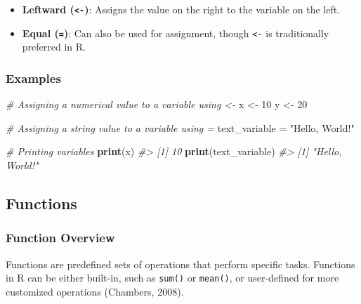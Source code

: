 \documentclass[
]{book}
\newenvironment{Shaded}{\begin{snugshade}}{\end{snugshade}}
\newcommand{\CommentTok}[1]{\textcolor[rgb]{0.56,0.35,0.01}{\textit{#1}}}
\newcommand{\DecValTok}[1]{\textcolor[rgb]{0.00,0.00,0.81}{#1}}
\newcommand{\FunctionTok}[1]{\textcolor[rgb]{0.13,0.29,0.53}{\textbf{#1}}}
\newcommand{\NormalTok}[1]{#1}
\newcommand{\OtherTok}[1]{\textcolor[rgb]{0.56,0.35,0.01}{#1}}
\newcommand{\StringTok}[1]{\textcolor[rgb]{0.31,0.60,0.02}{#1}}
\providecommand{\tightlist}{%
  \setlength{\itemsep}{0pt}\setlength{\parskip}{0pt}}
\begin{document}
\begin{itemize}
\tightlist
\item
  \textbf{Leftward (\texttt{\textless{}-})}: Assigns the value on the right to the variable on the left.
\item
  \textbf{Equal (\texttt{=})}: Can also be used for assignment, though \texttt{\textless{}-} is traditionally preferred in R.
\end{itemize}

\hypertarget{examples-1}{%
\subsubsection*{Examples}\label{examples-1}}

\begin{Shaded}
\begin{Highlighting}[]
\CommentTok{\# Assigning a numerical value to a variable using \textless{}{-}}
\NormalTok{x }\OtherTok{\textless{}{-}} \DecValTok{10}
\NormalTok{y }\OtherTok{\textless{}{-}} \DecValTok{20}

\CommentTok{\# Assigning a string value to a variable using =}
\NormalTok{text\_variable }\OtherTok{=} \StringTok{"Hello, World!"}

\CommentTok{\# Printing variables}
\FunctionTok{print}\NormalTok{(x)}
\CommentTok{\#\textgreater{} [1] 10}
\FunctionTok{print}\NormalTok{(text\_variable)}
\CommentTok{\#\textgreater{} [1] "Hello, World!"}
\end{Highlighting}
\end{Shaded}

\hypertarget{functions}{%
\subsection*{Functions}\label{functions}}

\hypertarget{function-overview}{%
\subsubsection*{Function Overview}\label{function-overview}}

Functions are predefined sets of operations that perform specific tasks. Functions in R can be either built-in, such as \texttt{sum()} or \texttt{mean()}, or user-defined for more customized operations (Chambers, 2008).
\end{document}
